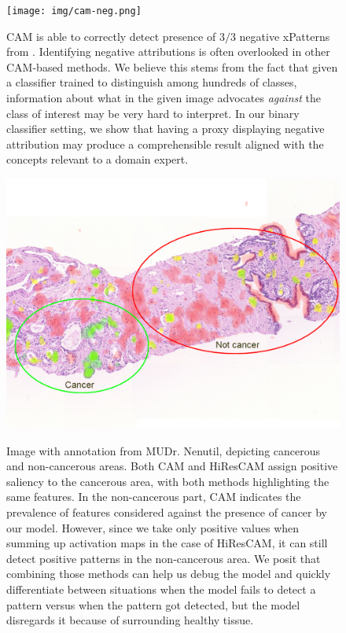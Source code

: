 \begin{figure}
    \begin{center}
    \begin{minipage}{0.8\textwidth}
      {\texttt{[image: img/cam-neg.png]}}
    \end{minipage}
    \caption{CAM is able to correctly detect presence of $3/3$ negative xPatterns from \cite{gallo}. Identifying negative attributions is often overlooked in other CAM-based methods. We believe this stems from the fact that given a classifier trained to distinguish among hundreds of classes, information about what in the given image advocates \emph{against} the class of interest may be very hard to interpret. In our binary classifier setting, we show that having a proxy displaying negative attribution may produce a comprehensible result aligned with the concepts relevant to a domain expert.}
    \label{fig:cam-neg}
    \end{center}
\end{figure}

\begin{figure}
    \begin{center}
    \begin{minipage}{1\textwidth}
      {\includegraphics[width=\textwidth]{img/ruda-annot.png}}
    \end{minipage}
    \caption{
    Image with annotation from MUDr. Nenutil, depicting cancerous and non-cancerous areas. Both CAM and HiResCAM assign positive saliency to the cancerous area, with both methods highlighting the same features. In the non-cancerous part, CAM indicates the prevalence of features considered against the presence of cancer by our model. However, since we take only positive values when summing up activation maps in the case of HiResCAM, it can still detect positive patterns in the non-cancerous area. We posit that combining those methods can help us debug the model and quickly differentiate between situations when the model fails to detect a pattern versus when the pattern got detected, but the model disregards it because of surrounding healthy tissue.
    }
    \label{fig:ruda-annot}
    \end{center}
\end{figure}